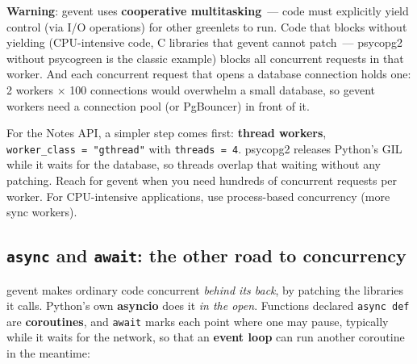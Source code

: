 \begin{warnbox}

\textbf{Warning}: gevent uses \textbf{cooperative multitasking}~--- code must explicitly yield control (via I/O operations) for other greenlets to run. Code that blocks without yielding (CPU-intensive code, C libraries that gevent cannot patch~--- psycopg2 without psycogreen is the classic example) blocks all concurrent requests in that worker. And each concurrent request that opens a database connection holds one: 2 workers × 100 connections would overwhelm a small database, so gevent workers need a connection pool (or PgBouncer) in front of it.

\end{warnbox}

\noindent{}For the Notes API, a simpler step comes first: \textbf{thread workers}, \texttt{worker\_}\allowbreak{}\texttt{class\ =}\allowbreak{}\texttt{\ "gthread"} with \texttt{threads\ =\ 4}. psycopg2 releases Python's GIL while it waits for the database, so threads overlap that waiting without any patching. Reach for gevent when you need hundreds of concurrent requests per worker. For CPU-intensive applications, use process-based concurrency (more sync workers).

\subsection*{\texorpdfstring{\texttt{async} and \texttt{await}: the other road to concurrency}{async and await: the other road to concurrency}}\label{36-scaling-load:async-and-await-the-other-road-to-concurrency}

gevent makes ordinary code concurrent \emph{behind its back}, by patching the libraries it calls. Python's own \textbf{asyncio} does it \emph{in the open}. Functions declared \texttt{async\ def} are \textbf{coroutines}, and \texttt{await} marks each point where one may pause, typically while it waits for the network, so that an \textbf{event loop} can run another coroutine in the meantime:

